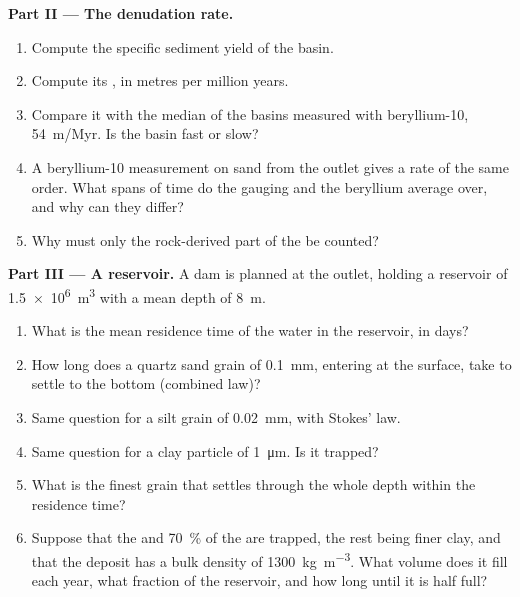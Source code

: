 \begin{problem}
\medskip
\noindent\textbf{Part II --- The denudation rate.}
\begin{enumerate}[resume]
  \item Compute the specific sediment yield of the basin.
  \item Compute its , in metres per million years.
  \item Compare it with the median of the basins measured with beryllium-10,
        \qty{54}{m/Myr}. Is the basin fast or slow?
  \item A beryllium-10 measurement on sand from the outlet gives a rate of
        the same order. What spans of time do the gauging and the beryllium
        average over, and why can they differ?
  \item Why must only the rock-derived part of the  be counted?
\end{enumerate}

\medskip
\noindent\textbf{Part III --- A reservoir.}
A dam is planned at the outlet, holding a reservoir of
\qty{1.5e6}{m^3} with a mean depth of \qty{8}{m}.
\begin{enumerate}[resume]
  \item What is the mean residence time of the water in the reservoir, in
        days?
  \item How long does a quartz sand grain of \qty{0.1}{mm}, entering at the
        surface, take to settle to the bottom (combined law)?
  \item Same question for a silt grain of \qty{0.02}{mm}, with Stokes' law.
  \item Same question for a clay particle of \qty{1}{\micro m}. Is it
        trapped?
  \item What is the finest grain that settles through the whole depth within
        the residence time?
  \item Suppose that the  and \qty{70}{\percent} of the  are trapped, the rest being finer clay, and that the deposit has
        a bulk density of \qty{1300}{kg.m^{-3}}. What volume does it fill each
        year, what fraction of the reservoir, and how long until it is half
        full?
\end{enumerate}


\end{problem}
